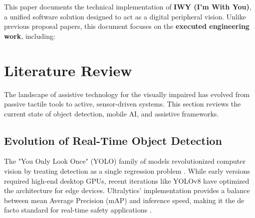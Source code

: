 \documentclass[11pt, a4paper, twocolumn]{article}
\begin{document}
This paper documents the technical implementation of \textbf{IWY (I'm With You)}, a unified software solution designed to act as a digital peripheral vision. Unlike previous proposal papers, this document focuses on the \textbf{executed engineering work}, including:

\section{Literature Review}
The landscape of assistive technology for the visually impaired has evolved from passive tactile tools to active, sensor-driven systems. This section reviews the current state of object detection, mobile AI, and assistive frameworks.

\subsection{Evolution of Real-Time Object Detection}
The "You Only Look Once" (YOLO) family of models revolutionized computer vision by treating detection as a single regression problem \cite{redmon2016}. While early versions required high-end desktop GPUs, recent iterations like YOLOv8 have optimized the architecture for edge devices. Ultralytics' implementation provides a balance between mean Average Precision (mAP) and inference speed, making it the de facto standard for real-time safety applications \cite{ultralytics}.
\end{document}
